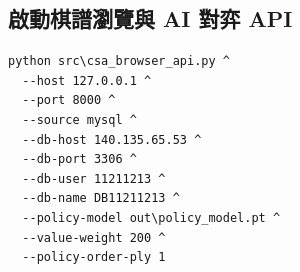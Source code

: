 \documentclass[12pt,a4paper,fontset=none]{ctexart}
\begin{document}
\subsection{啟動棋譜瀏覽與 AI 對弈 API}
\begin{lstlisting}[style=cmd]
python src\csa_browser_api.py ^
  --host 127.0.0.1 ^
  --port 8000 ^
  --source mysql ^
  --db-host 140.135.65.53 ^
  --db-port 3306 ^
  --db-user 11211213 ^
  --db-name DB11211213 ^
  --policy-model out\policy_model.pt ^
  --value-weight 200 ^
  --policy-order-ply 1
\end{lstlisting}
\end{document}
